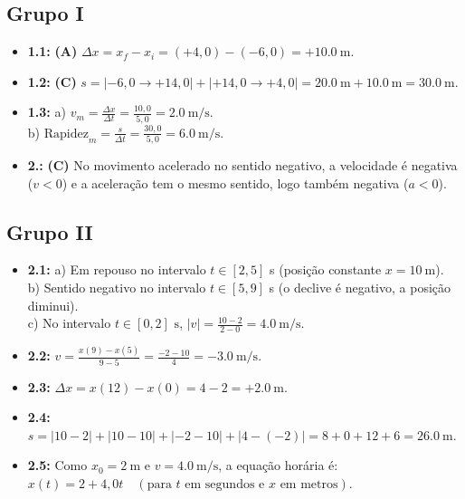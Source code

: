 \documentclass[11pt, a4paper]{article}
\begin{document}
\subsection*{Grupo I}
\begin{itemize}[leftmargin=1.5em]
  \item \textbf{1.1:} \textbf{(A)} $\Delta x = x_f - x_i = (+4{,}0) - (-6{,}0) = +\SI{10,0}{\meter}$.
  \item \textbf{1.2:} \textbf{(C)} $s = |-6{,}0 \to +14{,}0| + |+14{,}0 \to +4{,}0| = \SI{20,0}{\meter} + \SI{10,0}{\meter} = \SI{30,0}{\meter}$.
  \item \textbf{1.3:} 
    a) $v_m = \frac{\Delta x}{\Delta t} = \frac{10,0}{5,0} = \SI{2,0}{\meter\per\second}$. \\
    b) $\text{Rapidez}_m = \frac{s}{\Delta t} = \frac{30,0}{5,0} = \SI{6,0}{\meter\per\second}$.
  \item \textbf{2.:} \textbf{(C)} No movimento acelerado no sentido negativo, a velocidade é negativa ($v < 0$) e a aceleração tem o mesmo sentido, logo também negativa ($a < 0$).
\end{itemize}

\subsection*{Grupo II}
\begin{itemize}[leftmargin=1.5em]
  \item \textbf{2.1:} 
    a) Em repouso no intervalo $t \in [2, 5]$ \unit{\second} (posição constante $x = \SI{10}{\meter}$). \\
    b) Sentido negativo no intervalo $t \in [5, 9]$ \unit{\second} (o declive é negativo, a posição diminui). \\
    c) No intervalo $t \in [0, 2]\text{ s}$, $|v| = \frac{10 - 2}{2 - 0} = \SI{4,0}{\meter\per\second}$.
  \item \textbf{2.2:} $v = \frac{x(9) - x(5)}{9 - 5} = \frac{-2 - 10}{4} = \SI{-3,0}{\meter\per\second}$.
  \item \textbf{2.3:} $\Delta x = x(12) - x(0) = 4 - 2 = +\SI{2,0}{\meter}$.
  \item \textbf{2.4:} $s = |10 - 2| + |10 - 10| + |-2 - 10| + |4 - (-2)| = 8 + 0 + 12 + 6 = \SI{26,0}{\meter}$.
  \item \textbf{2.5:} Como $x_0 = \SI{2}{\meter}$ e $v = \SI{4,0}{\meter\per\second}$, a equação horária é: $x(t) = 2 + 4,0 t \quad (\text{para } t \text{ em segundos e } x \text{ em metros})$.
\end{itemize}
\end{document}
